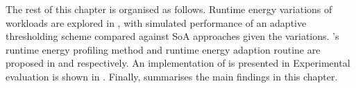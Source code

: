 The rest of this chapter is organised as follows.
Runtime energy variations of workloads are explored in , with simulated performance of an adaptive thresholding scheme compared against SoA approaches given the variations. 
\nn{}'s runtime energy profiling method and runtime energy adaption routine are proposed in  and  respectively. 
An implementation of \nn{} is presented in 
Experimental evaluation is shown in .
Finally,  summarises the main findings in this chapter. 
